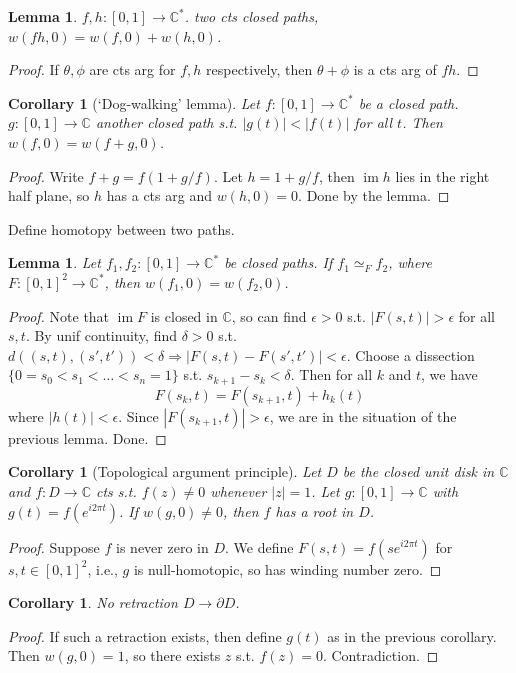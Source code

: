 \documentclass{article}
\theoremstyle{definition}
\theoremstyle{remark}
\theoremstyle{plain}
\newtheorem{lem}[defn]{Lemma}
\newtheorem{crly}[defn]{Corollary}
\newcommand{\CC}{\mathbb{C}}
\newcommand{\im}{\operatorname{im}}
\begin{document}
\begin{lem}
    $f,h:[0,1]\to\CC^\ast$. two cts closed paths, $w(fh,0)=w(f,0)+w(h,0)$.
\end{lem}
\begin{proof}
    If $\theta,\phi$ are cts arg for $f,h$ respectively, then $\theta+\phi$ is a cts arg of $fh$.
\end{proof}
\begin{crly}[`Dog-walking' lemma]
    Let $f:[0,1]\to\CC^\ast$ be a closed path. $g:[0,1]\to\CC$ another closed path s.t. $|g(t)|<|f(t)|$ for all $t$. Then $w(f,0)=w(f+g,0)$. 
\end{crly}
\begin{proof}
    Write $f+g=f(1+g/f)$. Let $h=1+g/f$, then $\im h$ lies in the right half plane, so $h$ has a cts arg and $w(h,0)=0$. Done by the lemma.
\end{proof}
Define homotopy between two paths.
\begin{lem}
    Let $f_1,f_2:[0,1]\to\CC^\ast$ be closed paths. If $f_1\simeq_F f_2$, where $F:[0,1]^2\to\CC^\ast$, then $w(f_1,0)=w(f_2,0)$.
\end{lem}
\begin{proof}
    Note that $\im F$ is closed in $\CC$, so can find $\epsilon>0$ s.t. $|F(s,t)|>\epsilon$ for all $s,t$. By unif continuity, find $\delta>0$ s.t. $d((s,t),(s',t'))<\delta\Rightarrow|F(s,t)-F(s',t')|<\epsilon$. Choose a dissection $\{0=s_0<s_1<\ldots<s_n=1\}$ s.t. $s_{k+1}-s_k<\delta$. Then for all $k$ and $t$, we have
    \[F(s_k,t)=F(s_{k+1},t)+h_k(t)\]
    where $|h(t)|<\epsilon$. Since $|F(s_{k+1},t)|>\epsilon$, we are in the situation of the previous lemma. Done.
\end{proof}
\begin{crly}[Topological argument principle]
    Let $D$ be the closed unit disk in $\CC$ and $f:D\to \CC$ cts s.t. $f(z)\neq 0$ whenever $|z|=1$. Let $g:[0,1]\to\CC$ with $g(t)=f(e^{i2\pi t})$. If $w(g,0)\neq 0$, then $f$ has a root in $D$.
\end{crly}
\begin{proof}
    Suppose $f$ is never zero in $D$. We define $F(s,t)=f(se^{i2\pi t})$ for $s,t\in [0,1]^2$, i.e., $g$ is null-homotopic, so has winding number zero.
\end{proof}
\begin{crly}
    No retraction $D\to\partial D$.
\end{crly}
\begin{proof}
    If such a retraction exists, then define $g(t)$ as in the previous corollary. Then $w(g,0)=1$, so there exists $z$ s.t. $f(z)=0$. Contradiction.
\end{proof}
\end{document}
